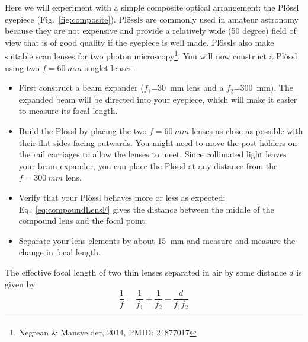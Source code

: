 \documentclass[a4paper]{report}
\begin{document}
Here we will experiment with a simple composite optical arrangement: the Pl\"{o}ssl eyepiece (Fig.~\ref{fig:composite}). 
Pl\"{o}ssls are commonly used in amateur astronomy because they are not expensive and provide a relatively wide (50 degree) field of view that is of good 
quality if the eyepiece is well made. 
Pl\"{o}ssls also make suitable scan lenses for two photon microscopy\footnote{Negrean \& Mansvelder, 2014, PMID: 24877017}.
You will now construct a Pl\"{o}ssl using two $f=60~mm$ singlet lenses.


\begin{itemize}
\item First construct a beam expander ($f_1$=30~mm lens and a $f_2$=300~mm). 
The expanded beam will be directed into your eyepiece, which will make it easier to measure its focal length.
\item Build the Pl\"ossl by placing the two $f=60~mm$ lenses as close as possible with their flat sides facing outwards. 
You might need to move the post holders on the rail carriages to allow the lenses to meet.
Since collimated light leaves your beam expander, you can place the Pl\"ossl at any distance from the $f=300~mm$ lens. 
\item Verify that your Pl\"{o}ssl behaves more or less as expected: 
Eq.~\ref{eq:compoundLensF} gives the distance between the middle of the compound lens and the focal point. 
\item Separate your lens elements by about 15~mm and measure and measure the change in focal length.
\end{itemize}

The effective focal length of two thin lenses separated in air by some distance $d$ is given by
\begin{equation}
\frac{1}{f} = \frac{1}{f_1} + \frac{1}{f_2} - \frac{d}{f_1f_2}
\label{eq:compoundLensF}
\end{equation}

\end{document}
